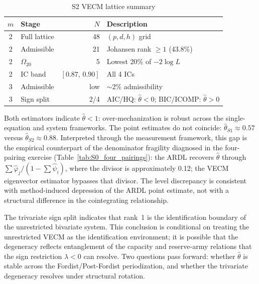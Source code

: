 \begin{table}[!ht]
	\centering
	\small
	\caption{S2 VECM lattice summary}
	\label{tab:S2_lattice_stats}
	\begin{tabular}{clrl}
		\hline\hline
		$m$ & Stage & $N$ & Description \\
		\hline
		2 & Full lattice & 48 & $(p,d,h)$ grid \\
		2 & Admissible & 21 & Johansen rank $\geq 1$ (43.8\%) \\
		2 & $\Omega_{20}$ & 5 & Lowest 20\% of $-2\log L$ \\
		2 & IC band & $[0.87,\, 0.90]$ & All 4 ICs \\
		\hline
		3 & Admissible & low & $\sim$2\% admissibility \\
		3 & Sign split & 2/4 &
		AIC/HQ: $\hat{\theta} < 0$;
		BIC/ICOMP: $\hat{\theta} > 0$ \\
		\hline
	\end{tabular}
\end{table}

Both estimators indicate $\hat{\theta} < 1$: over-mechanization is robust
across the single-equation and system frameworks. The point estimates do not
coincide: $\hat{\theta}_{S1} \approx 0.57$ versus
$\hat{\theta}_{S2} \approx 0.88$. Interpreted through the measurement
framework, this gap is the empirical counterpart of the denominator
fragility diagnosed in the four-pairing exercise
(Table~\ref{tab:S0_four_pairings}): the ARDL recovers $\hat{\theta}$ through
$\sum\hat{\varphi}_j / (1 - \sum\hat{\psi}_i)$, where the divisor is
approximately 0.12; the VECM eigenvector estimator bypasses that divisor.
The level discrepancy is consistent with method-induced depression of the
ARDL point estimate, not with a structural difference in the cointegrating
relationship.

The trivariate sign split indicates that rank~1 is the identification
boundary of the unrestricted bivariate system. This conclusion is
conditional on treating the unrestricted VECM as the identification
environment; it is possible that the degeneracy reflects entanglement of
the capacity and reserve-army relations that the sign restriction
$\lambda < 0$ can resolve. Two questions pass forward: whether
$\hat{\theta}$ is stable across the Fordist/Post-Fordist periodization,
and whether the trivariate degeneracy resolves under structural rotation.



